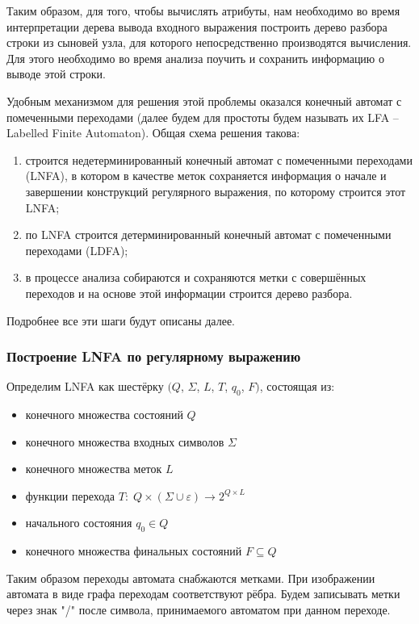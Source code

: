 Таким образом, для того, чтобы вычислять атрибуты, нам необходимо во время интерпретации дерева вывода входного выражения построить дерево разбора строки из сыновей узла, для которого непосредственно производятся вычисления. Для этого необходимо во время анализа поучить и сохранить информацию о выводе этой строки. 

Удобным механизмом для решения этой проблемы оказался конечный автомат с помеченными переходами (далее будем для простоты будем называть их LFA -- Labelled Finite Automaton). Общая схема решения такова: 
\begin{enumerate}
	\item строится недетерминированный конечный автомат с помеченными переходами (LNFA), в котором в качестве меток сохраняется информация о начале и завершении конструкций регулярного выражения, по которому строится этот LNFA;
  \item по LNFA строится детерминированный конечный автомат с помеченными переходами (LDFA);
  \item в процессе анализа собираются и сохраняются метки с совершённых переходов и на основе этой информации строится дерево разбора.
\end{enumerate}

Подробнее все эти шаги будут описаны далее.



\subsubsection{Построение LNFA по регулярному выражению}

Определим LNFA как шестёрку $(Q$, $\Sigma$, $L$, $T$, $q_0$, $F)$, состоящая из:
\begin{itemize}
	\item конечного множества состояний $Q$ 
	\item конечного множества входных символов $\Sigma$ 
	\item конечного множества меток $L$ 
	\item функции перехода $T: \; Q \times (\Sigma \cup{ \varepsilon })\rightarrow 2^{Q \times L}$
	\item начального состояния $q_0 \in Q$
	\item конечного множества финальных состояний $F \subseteq Q$ 
\end{itemize}

Таким образом переходы автомата снабжаются метками. При изображении автомата в виде графа переходам соответствуют рёбра. Будем записывать метки через знак "/" \; после символа, принимаемого автоматом при данном переходе. 

